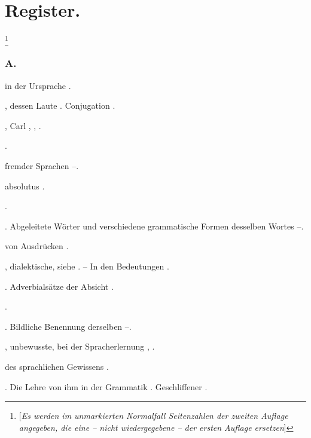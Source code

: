 \chapter*{Register.}\label{Register}
 
\footnote{[\textit{Es werden im unmarkierten Normalfall Seitenzahlen der zweiten Auflage angegeben, die eine – nicht wiedergegebene – der ersten Auflage ersetzen}]}
\begin{register}
\subsection*{A.}\label{reg.A}

 in der  Ursprache \pageref{sp.188}.

, dessen Laute \pageref{sp.34}. Conjugation \pageref{sp.423}.

, Carl \sed{\pageref{sp.229}}, \pageref{sp.244}, \pageref{sp.380}.

 \pageref{sp.245}.

 fremder Sprachen \pageref{sp.68}–\pageref{sp.69}.


 absolutus \pageref{sp.467}.

 \pageref{sp.200}.

. Abgeleitete Wörter und verschiedene grammatische Formen desselben Wortes \pageref{sp.121}–\pageref{sp.122}.

 von Ausdrücken \pageref{sp.45}.

, dialektische, siehe . – In den Bedeutungen \pageref{sp.100}.

. Adverbialsätze der Absicht \pageref{sp.104}.

 \pageref{sp.322}.

. Bildliche Benennung derselben \pageref{sp.42}–\pageref{sp.43}.

, unbewusste, bei der Spracherlernung \pageref{sp.63}, \sed{\pageref{sp.210}}.

 des sprachlichen Gewissens \pageref{sp.276}.

. Die Lehre von ihm in der Grammatik \pageref{sp.87}.  Geschliffener \pageref{sp.200}.


\end{register}
